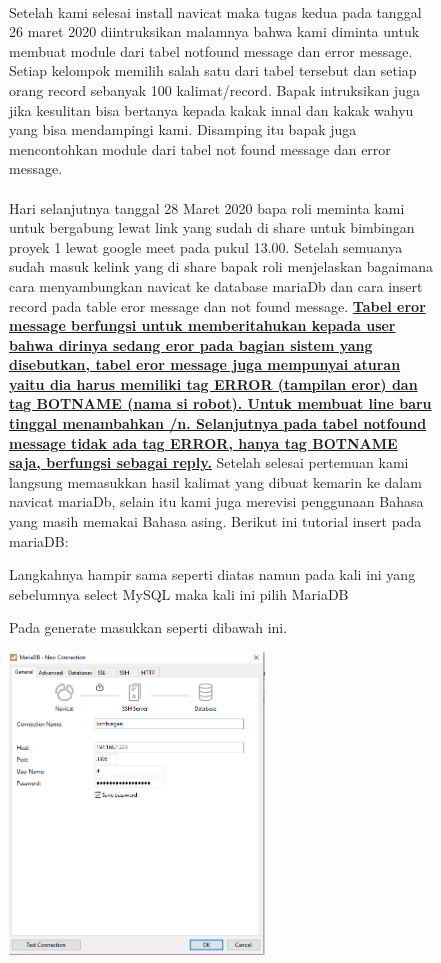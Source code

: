 \documentclass{book}
\begin{document}
\begin{enumerate}
\begin{figure} [ht]
\paragraph{} \quad Setelah kami selesai install navicat maka tugas kedua pada tanggal 26 maret 2020 diintruksikan malamnya bahwa kami diminta untuk membuat module dari tabel notfound message dan error message. Setiap kelompok memilih salah satu dari tabel tersebut dan setiap orang record sebanyak 100 kalimat/record. Bapak intruksikan juga jika kesulitan bisa bertanya kepada kakak innal dan kakak wahyu yang bisa mendampingi kami. Disamping itu bapak juga mencontohkan module dari tabel not found message dan error message.
\paragraph{}\quad Hari selanjutnya tanggal 28 Maret 2020 bapa roli meminta kami untuk bergabung lewat link yang sudah di share untuk bimbingan proyek 1 lewat google meet pada pukul 13.00. Setelah semuanya sudah masuk kelink yang di share bapak roli menjelaskan bagaimana cara menyambungkan navicat ke database mariaDb dan cara insert record pada table eror message dan not found message. {\textbf \underline {Tabel eror message berfungsi untuk memberitahukan kepada user bahwa dirinya sedang eror pada bagian sistem yang disebutkan, tabel eror message juga mempunyai aturan yaitu dia harus memiliki tag ERROR (tampilan eror) dan tag BOTNAME (nama si robot). Untuk membuat line baru tinggal menambahkan /n. Selanjutnya pada tabel notfound message tidak ada tag ERROR, hanya tag BOTNAME saja, berfungsi sebagai reply.}} Setelah selesai pertemuan kami langsung memasukkan hasil kalimat yang dibuat kemarin ke dalam navicat mariaDb, selain itu kami juga merevisi penggunaan Bahasa yang masih memakai Bahasa asing. Berikut ini tutorial insert pada mariaDB:\\
    \item Langkahnya hampir sama seperti diatas namun pada kali ini yang sebelumnya select MySQL maka kali ini pilih MariaDB\\
    \item Pada generate masukkan seperti dibawah ini.\\
    \centerline{\includegraphics [width=6.85 cm, height=8.03cm]{figures/2.1.png}}\\

\end{figure}
\end{enumerate}
\end{document}
